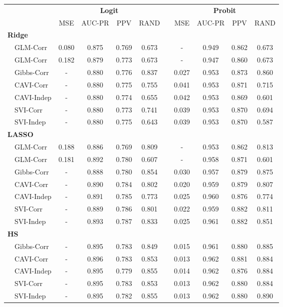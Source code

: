 \begin{center}
\begin{tabular}{lccccccccc}
\hline\hline
\multicolumn{1}{l}{\bfseries }&\multicolumn{4}{c}{\bfseries Logit}&\multicolumn{1}{c}{\bfseries }&\multicolumn{4}{c}{\bfseries Probit}\tabularnewline
\cline{2-5} \cline{7-10}
\multicolumn{1}{l}{}&\multicolumn{1}{c}{MSE}&\multicolumn{1}{c}{AUC-PR}&\multicolumn{1}{c}{PPV}&\multicolumn{1}{c}{RAND}&\multicolumn{1}{c}{}&\multicolumn{1}{c}{MSE}&\multicolumn{1}{c}{AUC-PR}&\multicolumn{1}{c}{PPV}&\multicolumn{1}{c}{RAND}\tabularnewline
\hline
{\bfseries Ridge}&&&&&&&&&\tabularnewline
~~GLM-Corr&0.080&0.875&0.769&0.673&&-&0.949&0.862&0.673\tabularnewline
~~GLM-Corr&0.182&0.879&0.773&0.673&&-&0.947&0.860&0.673\tabularnewline
~~Gibbs-Corr&-&0.880&0.776&0.837&&0.027&0.953&0.873&0.860\tabularnewline
~~CAVI-Corr&-&0.880&0.775&0.755&&0.041&0.953&0.871&0.715\tabularnewline
~~CAVI-Indep&-&0.880&0.774&0.655&&0.042&0.953&0.869&0.601\tabularnewline
~~SVI-Corr&-&0.880&0.773&0.741&&0.039&0.953&0.870&0.694\tabularnewline
~~SVI-Indep&-&0.880&0.775&0.643&&0.039&0.953&0.870&0.587\tabularnewline
\hline
{\bfseries LASSO}&&&&&&&&&\tabularnewline
~~GLM-Corr&0.188&0.886&0.769&0.809&&-&0.953&0.862&0.813\tabularnewline
~~GLM-Corr&0.181&0.892&0.780&0.607&&-&0.958&0.871&0.601\tabularnewline
~~Gibbs-Corr&-&0.888&0.780&0.854&&0.030&0.957&0.879&0.875\tabularnewline
~~CAVI-Corr&-&0.890&0.784&0.802&&0.020&0.959&0.879&0.807\tabularnewline
~~CAVI-Indep&-&0.891&0.785&0.773&&0.025&0.960&0.876&0.774\tabularnewline
~~SVI-Corr&-&0.889&0.786&0.801&&0.022&0.959&0.882&0.811\tabularnewline
~~SVI-Indep&-&0.893&0.787&0.833&&0.025&0.961&0.882&0.851\tabularnewline
\hline
{\bfseries HS}&&&&&&&&&\tabularnewline
~~Gibbs-Corr&-&0.895&0.783&0.849&&0.015&0.961&0.880&0.885\tabularnewline
~~CAVI-Corr&-&0.896&0.783&0.853&&0.013&0.962&0.881&0.884\tabularnewline
~~CAVI-Indep&-&0.895&0.779&0.855&&0.014&0.962&0.876&0.884\tabularnewline
~~SVI-Corr&-&0.895&0.783&0.853&&0.013&0.962&0.880&0.884\tabularnewline
~~SVI-Indep&-&0.895&0.782&0.855&&0.013&0.962&0.880&0.890\tabularnewline
\hline
\end{tabular}\end{center}
